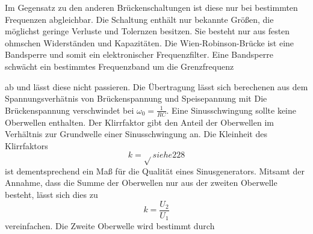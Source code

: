 Im Gegensatz zu den anderen Brückenschaltungen ist diese nur bei bestimmten Frequenzen abgleichbar.
Die Schaltung enthält nur bekannte Größen, die möglichst geringe Verluste und Tolernzen besitzen.
Sie besteht nur aus festen ohmschen Widerständen und Kapazitäten.
Die Wien-Robinson-Brücke ist eine Bandsperre und somit ein elektronischer Frequenzfilter.
Eine Bandsperre schwächt ein bestimmtes Frequenzband um die Grenzfrequenz
\begin{equation}
        
\end{equation}

ab und lässt diese nicht passieren.
Die Übertragung lässt sich berechenen aus dem Spannungsverhätnis von Brückenspannung und Speisepannung
mit 
Die Brückenspannung verschwindet bei $\omega_0 = \frac{1}{RC}$.
Eine Sinusschwingung sollte keine Oberwellen enthalten. 
Der Klirrfaktor gibt den Anteil der Oberwellen im Verhältnis zur Grundwelle einer Sinusschwingung an.
Die Kleinheit des Klirrfaktors
\begin{equation}
    k =  \sqrt{} siehe 228
\end{equation}
ist dementsprechend ein Maß für die Qualität eines Sinusgenerators.
Mitsamt der Annahme, dass die Summe der Oberwellen nur aus der zweiten Oberwelle besteht, lässt sich dies zu 
\begin{equation}
    k = \frac{U_2}{U_1}
    \label{eqn:keinf}
\end{equation}
vereinfachen.
Die Zweite Oberwelle wird bestimmt durch

